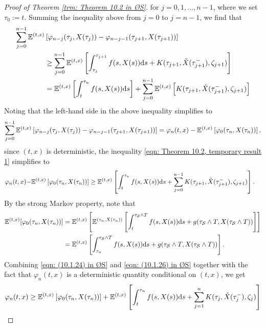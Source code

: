 \begin{proof}[Proof of Theorem \ref{trm: Theorem 10.2 in ØS}]
    for $j=0,1,\ldots,n-1$, where we set $\tau_0:= t$. Summing the inequality above from $j=0$ to $j=n-1$, we find that
    \begin{align}
        \sum_{j=0}^{n-1} \mathbb{E}^{(t,x)} & \left[ \varphi_{n-j}(\tau_j, X(\tau_j)) - \varphi_{n-j-1}(\tau_{j+1}, X(\tau_{j+1}))\right] \nonumber \\
        & \geq \sum_{j=0}^{n-1} \mathbb{E}^{(t,x)} \left[ \int_{\tau_j}^{\tau_{j+1}} f(s,X(s)) \mathrm{d} s + K(\tau_{j+1},\check{X}(\tau_{j+1}^-), \zeta_{j+1}) \right] \nonumber \\
        &= \mathbb{E}^{(t,x)} \left[ \int_t^{\tau_n} f(s,X(s)) \mathrm{d} s \right] + \sum_{j=0}^{n-1} \mathbb{E}^{(t,x)} \left[ K(\tau_{j+1},\check{X}(\tau_{j+1}^-), \zeta_{j+1}) \right]
        \label{eqn: Theorem 10.2, temporary result 1}
    \end{align}
    Noting that the left-hand side in the above inequality simplifies to
    \begin{equation*}
        \sum_{j=0}^{n-1} \mathbb{E}^{(t,x)} \left[ \varphi_{n-j}(\tau_j, X(\tau_j)) - \varphi_{n-j-1}(\tau_{j+1}, X(\tau_{j+1}))\right] = \varphi_n(t,x) - \mathbb{E}^{(t,x)} \left[\varphi_0(\tau_n,X(\tau_n))\right],
    \end{equation*}
    since $(t,x)$ is deterministic, the inequality \eqref{eqn: Theorem 10.2, temporary result 1} simplifies to
    \begin{align}
        \varphi_n(t,x) - &\mathbb{E}^{(t,x)} \left[ \varphi_0(\tau_n, X(\tau_n)) \right] \geq \mathbb{E}^{(t,x)} \left[ \int_t^{\tau_n} f(s,X(s)) \mathrm{d} s + \sum_{j=0}^{n-1}K(\tau_{j+1},\check{X}(\tau_{j+1}^-), \zeta_{j+1}) \right].
        \label{eqn: (10.1.24) in ØS}
    \end{align}
    By the strong Markov property, note that
    \begin{align}
        \mathbb{E}^{(t,x)} [\varphi_0(\tau_n, X(\tau_n))] &= \mathbb{E}^{(t,x)} \left[ \mathbb{E}^{(\tau_n, X(\tau_n))}\left[ \int_t^{\tau_{\mathcal{S}} \wedge T} f(s,X(s)) \mathrm{d} s + g(\tau_{\mathcal{S}} \wedge T,X(\tau_{\mathcal{S}} \wedge T)) \right] \right] \nonumber \\
        &= \mathbb{E}^{(t,x)} \left[ \int_{\tau_n}^{\tau_{\mathcal{S}} \wedge T} f(s,X(s)) \mathrm{d} s + g(\tau_{\mathcal{S}} \wedge T,X(\tau_{\mathcal{S}} \wedge T)) \right].
        \label{eqn: (10.1.26) in ØS}
    \end{align}
    Combining \eqref{eqn: (10.1.24) in ØS} and \eqref{eqn: (10.1.26) in ØS} together with the fact that $\varphi_n(t,x)$ is a deterministic quantity conditional on $(t,x)$, we get
    \begin{align}
        \varphi_n(t,x) &\geq  \Etx\left[ \varphi_0(\tau_n, X(\tau_n)) \right] + \Etx\left[ \int_t^{\tau_n} f(s,X(s)) \diff s + \sum_{j=1}^n K(\tau_j,\check{X}(\tau_j^-),\zeta_j) \right] \nonumber \\

\end{align}
\end{proof}
